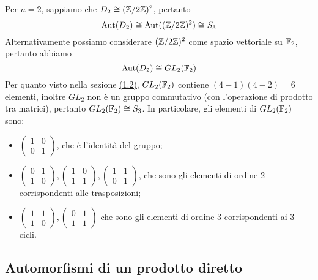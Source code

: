 \documentclass[11pt]{scrartcl}
\begin{document}
Per $n = 2$, sappiamo che $D_2 \cong (\mathbb{Z}/{2}\mathbb{Z})^2$, pertanto 
\[
    \operatorname{Aut}(D_2) \cong \operatorname{Aut}((\mathbb{Z}/{2}\mathbb{Z})^2) \cong S_3
\]
Alternativamente possiamo considerare $(\mathbb{Z}/{2}\mathbb{Z})^2$ come spazio vettoriale su $\mathbb F_2$,
pertanto abbiamo 
\[
    \operatorname{Aut}(D_2) \cong GL_2(\mathbb F_2)
\]Per quanto visto nella sezione \hyperref[aut sp vet]{(1.2)}, $GL_2(\mathbb F_2)$ 
contiene $(4 - 1)(4 - 2) = 6$ elementi, inoltre $GL_2$ non è un gruppo 
commutativo (con l'operazione di prodotto tra matrici), pertanto $GL_2(\mathbb F_2) \cong S_3$.
In particolare, gli elementi di $GL_2(\mathbb F_2)$ sono:
\begin{itemize}
    \item $\begin{pmatrix}
    1 & 0\\
    0 & 1
    \end{pmatrix}$, che è l'identità del gruppo;
    \item $\begin{pmatrix}
    0 & 1\\
    1 & 0
    \end{pmatrix}, \begin{pmatrix}
        1 & 0\\
        1 & 1
    \end{pmatrix}, \begin{pmatrix}
        1 & 1\\
        0 & 1
    \end{pmatrix}$, che sono gli elementi di ordine 2 corrispondenti alle 
    trasposizioni;
    \item $\begin{pmatrix}
    1 & 1\\
    1 & 0
    \end{pmatrix}, \begin{pmatrix}
        0 & 1\\
        1 & 1
    \end{pmatrix}$ che sono gli elementi di ordine $3$ corrispondenti ai $3$-cicli.
\end{itemize}

\newpage

\subsection{Automorfismi di un prodotto diretto}
\end{document}
